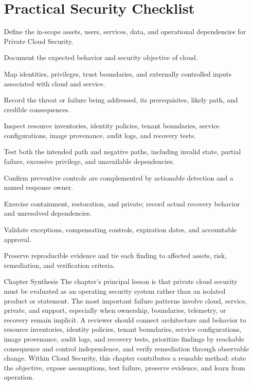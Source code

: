 \documentclass[11pt,letterpaper]{article}
\begin{document}
\section*{Practical Security Checklist}
\begin{CornellChecklist}
\item Define the in-scope assets, users, services, data, and operational dependencies for Private Cloud Security.
\item Document the expected behavior and security objective of cloud.
\item Map identities, privileges, trust boundaries, and externally controlled inputs associated with cloud and service.
\item Record the threat or failure being addressed, its prerequisites, likely path, and credible consequences.
\item Inspect resource inventories, identity policies, tenant boundaries, service configurations, image provenance, audit logs, and recovery tests.
\item Test both the intended path and negative paths, including invalid state, partial failure, excessive privilege, and unavailable dependencies.
\item Confirm preventive controls are complemented by actionable detection and a named response owner.
\item Exercise containment, restoration, and private; record actual recovery behavior and unresolved dependencies.
\item Validate exceptions, compensating controls, expiration dates, and accountable approval.
\item Preserve reproducible evidence and tie each finding to affected assets, risk, remediation, and verification criteria.
\end{CornellChecklist}
\begin{CornellSummaryBox}{Chapter Synthesis}
The chapter's principal lesson is that private cloud security must be evaluated as an operating security system rather than an isolated product or statement. The most important failure patterns involve cloud, service, private, and support, especially when ownership, boundaries, telemetry, or recovery remain implicit. A reviewer should connect architecture and behavior to resource inventories, identity policies, tenant boundaries, service configurations, image provenance, audit logs, and recovery tests, prioritize findings by reachable consequence and control independence, and verify remediation through observable change. Within Cloud Security, this chapter contributes a reusable method: state the objective, expose assumptions, test failure, preserve evidence, and learn from operation.
\end{CornellSummaryBox}
\end{document}
